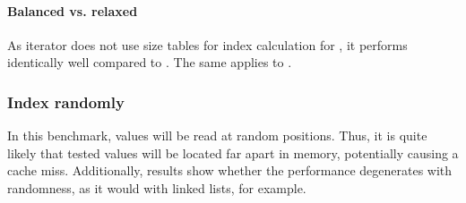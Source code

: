 \paragraph{Balanced vs. relaxed}
As iterator does not use size tables for index calculation for \rrbvec{}, it performs identically well compared to \rbvec{}. The same applies to \imrsvec{}.

\subsubsection*{Index randomly}
In this benchmark, values will be read at random positions. Thus, it is quite likely that tested values will be located far apart in memory, potentially causing a cache miss. Additionally, results show whether the performance degenerates with randomness, as it would with linked lists, for example.

